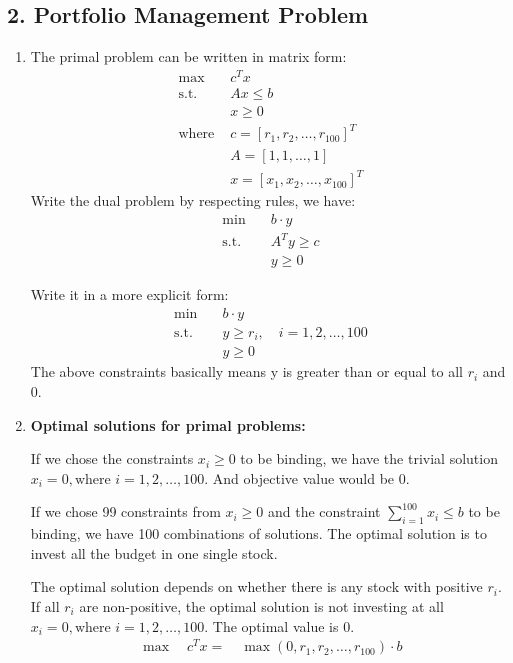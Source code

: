 \documentclass[12pt]{article}
\begin{document}
\subsection*{2. Portfolio Management Problem}
\begin{enumerate}[label= (\alph*), leftmargin=2em]
\item The primal problem can be written in matrix form:
\begin{align*}
\max \quad &c^T x \\
\text{s.t. } &Ax \leq b \\
&x \geq 0 \\
\text{where } &c = [r_1, r_2, \ldots, r_{100}]^T \\
&A = [1, 1, \ldots, 1] \\
&x = [x_1, x_2, \ldots, x_{100}]^T
\end{align*}
Write the dual problem by respecting rules, we have:
\begin{align*}
\min \quad &b\cdot y \\
\text{s.t. } &A^T y \geq c \\
&y \geq 0
\end{align*}

Write it in a more explicit form:
\begin{align*}
\min \quad &b\cdot y \\
\text{s.t. } &y \geq r_i, \quad i = 1, 2, \ldots, 100 \\
&y \geq 0
\end{align*}
The above constraints basically means y is greater than or equal to all $r_i$ and 0.
\item \textbf{Optimal solutions for primal problems:}

If we chose the constraints $x_i \geq 0$ to be binding, we have the trivial solution $x_i = 0, \text{where }i = 1, 2, \ldots, 100$. And objective value would be 0.

If we chose 99 constraints from $x_i \geq 0$ and the constraint $\sum_{i=1}^{100} x_i \leq b$ to be binding, we have 100 combinations of solutions. The optimal solution is to invest all the budget in one single stock.

The optimal solution depends on whether there is any stock with positive $r_i$. If all $r_i$ are non-positive, the optimal solution is not investing at all $x_i = 0, \text{where }i = 1, 2, \ldots, 100$. The optimal value is 0.
\begin{align*}
    \max \quad c^T x = \quad \max (0, r_1, r_2, \ldots, r_{100}) \cdot b
\end{align*}


\end{enumerate}
\end{document}
